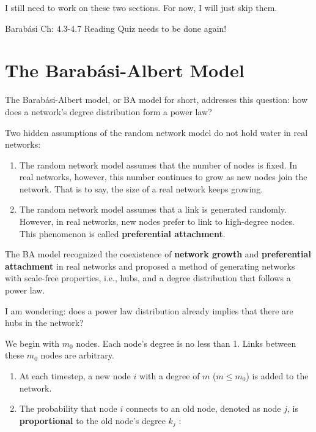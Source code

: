 \documentclass[
]{krantz}
\makeatletter
\newenvironment{kframe}{%
\medskip{}
\setlength{\fboxsep}{.8em}
 \def\at@end@of@kframe{}%
 \ifinner\ifhmode%
  \def\at@end@of@kframe{\end{minipage}}%
  \begin{minipage}{\columnwidth}%
 \fi\fi%
 \def\FrameCommand##1{\hskip\@totalleftmargin \hskip-\fboxsep
 \colorbox{shadecolor}{##1}\hskip-\fboxsep
     \hskip-\linewidth \hskip-\@totalleftmargin \hskip\columnwidth}%
 \MakeFramed {\advance\hsize-\width
   \@totalleftmargin\z@ \linewidth\hsize
   \@setminipage}}%
 {\par\unskip\endMakeFramed%
 \at@end@of@kframe}
\newenvironment{rmdblock}[1]
  {
  \begin{itemize}
  \renewcommand{\labelitemi}{
    \raisebox{-.7\height}[0pt][0pt]{
      {\setkeys{Gin}{width=3em,keepaspectratio}\texttt{[image: images/\#1]}}
    }
  }
  \setlength{\fboxsep}{1em}
  \begin{kframe}
  \item
  }
  {
  \end{kframe}
  \end{itemize}
  }
\newenvironment{rmdreminder}
  {\begin{rmdblock}{reminder}}
  {\end{rmdblock}}
\makeatother
\begin{document}
\begin{rmdreminder}
I still need to work on these two sections. For now, I will just skip them.
\end{rmdreminder}

\begin{rmdreminder}
Barabási Ch: 4.3-4.7 Reading Quiz needs to be done again!
\end{rmdreminder}

\hypertarget{the-barabuxe1si-albert-model}{%
\section{The Barabási-Albert Model}\label{the-barabuxe1si-albert-model}}

The Barabási-Albert model, or BA model for short, addresses this question: how does a network's degree distribution form a power law?

Two hidden assumptions of the random network model do not hold water in real networks:

\begin{enumerate}
\def\labelenumi{\arabic{enumi}.}
\item
  The random network model assumes that the number of nodes is fixed. In real networks, however, this number continues to grow as new nodes join the network. That is to say, the size of a real network keeps growing.
\item
  The random network model assumes that a link is generated randomly. However, in real networks, new nodes prefer to link to high-degree nodes. This phenomenon is called \textbf{preferential attachment}.
\end{enumerate}

The BA model recognized the coexistence of \textbf{network growth} and \textbf{preferential attachment} in real networks and proposed a method of generating networks with scale-free properties, i.e., hubs, and a degree distribution that follows a power law.

\begin{rmdreminder}
I am wondering: does a power law distribution already implies that there are hubs in the network?
\end{rmdreminder}

We begin with \(m_0\) nodes. Each node's degree is no less than 1. Links between these \(m_0\) nodes are arbitrary.

\begin{enumerate}
\def\labelenumi{\arabic{enumi}.}
\item
  At each timestep, a new node \(i\) with a degree of \(m\) (\(m \le m_0\)) is added to the network.
\item
  The probability that node \(i\) connects to an old node, denoted as node \(j\), is \textbf{proportional} to the old node's degree \(k_j\) \citep{menczer2020first}:
\end{enumerate}
\end{document}
